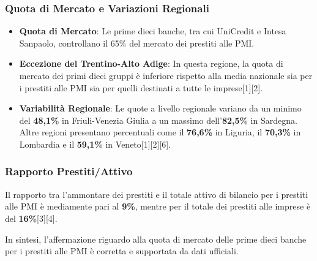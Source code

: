 \documentclass[
  letterpaper,
  DIV=11,
  numbers=noendperiod]{scrartcl}
\providecommand{\tightlist}{%
  \setlength{\itemsep}{0pt}\setlength{\parskip}{0pt}}\usepackage{longtable,booktabs,array}
\begin{document}
\subsubsection{Quota di Mercato e Variazioni
Regionali}\label{quota-di-mercato-e-variazioni-regionali}

\begin{itemize}
\tightlist
\item
  \textbf{Quota di Mercato}: Le prime dieci banche, tra cui UniCredit e
  Intesa Sanpaolo, controllano il 65\% del mercato dei prestiti alle
  PMI.
\item
  \textbf{Eccezione del Trentino-Alto Adige}: In questa regione, la
  quota di mercato dei primi dieci gruppi è inferiore rispetto alla
  media nazionale sia per i prestiti alle PMI sia per quelli destinati a
  tutte le imprese{[}1{]}{[}2{]}.
\item
  \textbf{Variabilità Regionale}: Le quote a livello regionale variano
  da un minimo del \textbf{48,1\%} in Friuli-Venezia Giulia a un massimo
  dell'\textbf{82,5\%} in Sardegna. Altre regioni presentano percentuali
  come il \textbf{76,6\%} in Liguria, il \textbf{70,3\%} in Lombardia e
  il \textbf{59,1\%} in Veneto{[}1{]}{[}2{]}{[}6{]}.
\end{itemize}

\subsubsection{Rapporto Prestiti/Attivo}\label{rapporto-prestitiattivo}

Il rapporto tra l'ammontare dei prestiti e il totale attivo di bilancio
per i prestiti alle PMI è mediamente pari al \textbf{9\%}, mentre per il
totale dei prestiti alle imprese è del \textbf{16\%}{[}3{]}{[}4{]}.

\begin{tcolorbox}[enhanced jigsaw, bottomrule=.15mm, opacityback=0, leftrule=.75mm, breakable, titlerule=0mm, left=2mm, title=\textcolor{quarto-callout-warning-color}{\faExclamationTriangle}\hspace{0.5em}{Conclusione}, colframe=quarto-callout-warning-color-frame, coltitle=black, colback=white, toprule=.15mm, colbacktitle=quarto-callout-warning-color!10!white, bottomtitle=1mm, toptitle=1mm, arc=.35mm, rightrule=.15mm, opacitybacktitle=0.6]

In sintesi, l'affermazione riguardo alla quota di mercato delle prime
dieci banche per i prestiti alle PMI è corretta e supportata da dati
ufficiali.

\end{tcolorbox}
\end{document}
